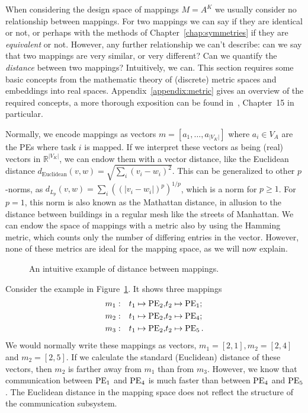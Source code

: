 When considering the design space of mappings $M = A^K$ we usually consider no relationship between mappings.
For two mappings we can say if they are identical or not, or perhaps with the methods of Chapter~\ref{chap:symmetries} if they are \emph{equivalent} or not.
However, any further relationship we can't describe: can we say that two mappings are very similar, or very different?
Can we quantify the \emph{distance} between two mappings?
Intuitively, we can.
This section requires some basic concepts from the mathematic theory of (discrete) metric spaces and embeddings into real spaces.
Appendix~\ref{appendix:metric} gives an overview of the required concepts, a more thorough exposition can be found in~\cite{matouvsek}, Chapter~15 in particular.

Normally, we encode mappings as vectors $m = \left[ a_1, \ldots, a_{|V_K|} \right]$ where $a_i \in V_A$ are the \acp{PE} where task $i$ is mapped.
If we interpret these vectors as being (real) vectors in $\mathbb{R}^{|V_K|}$, we can endow them with a vector distance, like the Euclidean distance $d_\text{Euclidean}(v,w) = \sqrt{\sum_i (v_i - w_i)^2}$.
This can be generalized to other $p$-norms, as $d_{L_p}(v,w) = \sum_i ((|v_i-w_i|)^p)^{1/p}$, which is a norm for $p \geq 1$.
For $p = 1$, this norm is also known as the Mathattan distance, in allusion to the distance between buildings in a regular mesh like the streets of Manhattan.
We can endow the space of mappings with a metric also by using the Hamming metric, which counts only the number of differing entries in the vector.
However, none of these metrics are ideal for the mapping space, as we will now explain.

\begin{figure}[h]
	\centering
   \resizebox{0.85\textwidth}{!}{
	   \begin{tikzpicture}
	   
	   \end{tikzpicture}
	   }
	\caption{An intuitive example of distance between mappings.}
	\label{fig:intuition_metric}
\end{figure}

Consider the example in Figure~\ref{fig:intuition_metric}. 
It shows three mappings 
\begin{align*}
	m_1: & & t_1 \mapsto \operatorname{PE}_2, & t_2 \mapsto \operatorname{PE}_1; \\ 
	m_2: & & t_1 \mapsto \operatorname{PE}_2, & t_2 \mapsto \operatorname{PE}_4; \\ 
	m_3: & & t_1 \mapsto \operatorname{PE}_2, & t_2 \mapsto \operatorname{PE}_5. \\ 
\end{align*}
We would normally write these mappings as vectors, $m_1 = \left[ 2, 1 \right], m_2 = \left[ 2, 4 \right]$ and $m_2 = \left[ 2, 5 \right].$
If we calculate the standard (Euclidean) distance of these vectors, then $m_2$ is farther away from $m_1$ than from $m_3$.
However, we know that communication between $\operatorname{PE}_1$ and $\operatorname{PE}_4$ is much faster than between $\operatorname{PE}_4$ and $\operatorname{PE}_5$. 
The Euclidean distance in the mapping space does not reflect the structure of the communication subsystem.

